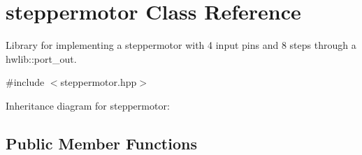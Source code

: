 \hypertarget{classsteppermotor}{}\section{steppermotor Class Reference}
\label{classsteppermotor}


Library for implementing a steppermotor with 4 input pins and 8 steps through a hwlib\+::port\+\_\+out.  




{\ttfamily \#include $<$steppermotor.\+hpp$>$}



Inheritance diagram for steppermotor\+:
\subsection*{Public Member Functions}
